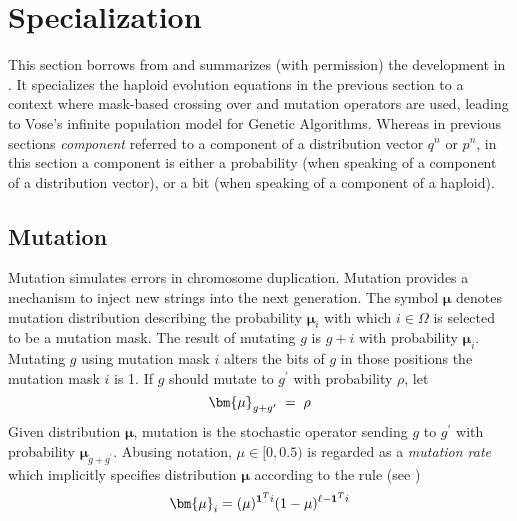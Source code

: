 \section{Specialization}\label{specialize}
This section borrows from and summarizes (with permission) the development in \cite{Vose1999}.
It specializes the haploid evolution equations in the previous section 
to a context where mask-based crossing over and mutation operators are used, 
leading to Vose's infinite population model for Genetic Algorithms.  Whereas 
in previous sections {\em component} referred to a component
of a distribution vector $q^n$ or $p^n$, in this section a component
is either a probability (when speaking of a component of a
distribution vector), or a bit (when speaking of a component of a
haploid).

\subsection{Mutation}
Mutation simulates errors in chromosome duplication. 
Mutation provides a mechanism to inject new strings into the next generation.
The symbol $\bm{\mu}$ denotes mutation distribution describing 
the probability $\bm{\mu}_i$ with which $i \in \Omega$ is selected to be a mutation mask. 
The result of mutating $g$ is $g + i$ with probability $\bm{\mu}_i$. 
Mutating $g$ using mutation mask $i$ alters the bits of $g$ in those positions the mutation mask $i$ is 1. 
If $g$ should mutate to $g^\prime$ with probability $\rho$,
let\\[-0.2in]
\[
\bm{\mu}_{g + g^\prime} \; = \; \rho\\[0.05in]
\]
Given distribution $\bm{\mu}$, mutation is the stochastic operator sending
$g$ to $g^\prime$ with probability $\bm{\mu}_{g + g^\prime}$.
Abusing notation, $\mu \in [0, 0.5)$ is regarded as a {\em mutation rate} which implicitly 
specifies distribution $\bm{\mu}$ according to the rule (see \cite{VoseWright1998})
\[
\bm{\mu}_i = (\mu)^{{\bf 1}^Ti} (1-\mu)^{\ell- {\bf 1}^Ti}
\]

